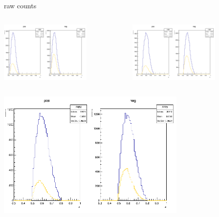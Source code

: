\begin{frame}{raw counts}
\begin{columns}
\begin{column}[T]{0.5\textwidth}
\includegraphics[width = 0.7\textwidth]{results/yield/statistics/counts_x_Q2_z_0.55_4.764_0.40.png}
\end{column}
\begin{column}[T]{0.5\textwidth}
\includegraphics[width = 0.7\textwidth]{results/yield/statistics/counts_x_Q2_z_0.55_4.764_0.50.png}
\end{column}
\end{columns}
\begin{columns}
\begin{column}[T]{0.5\textwidth}
\includegraphics[width = 0.7\textwidth]{results/yield/statistics/counts_x_Q2_z_0.55_4.764_0.60.png}

\end{column}
\end{columns}
\end{frame}
